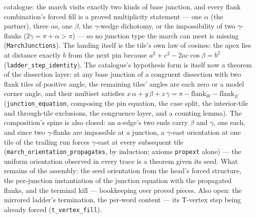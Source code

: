 \documentclass[11pt,reqno]{amsart}
\theoremstyle{plain}
\theoremstyle{definition}
\begin{document}
catalogue: the march visits exactly two kinds of base junction, and every flank combination's
forced fill is a proved multiplicity statement --- one $\alpha$ (the partner), three $\alpha$s,
one $\beta$, the $\gamma$-wedge dichotomy, or the impossibility of two $\gamma$-flanks
($2\gamma=\pi+\alpha>\pi$) --- so no junction type the march can meet is missing
(\texttt{MarchJunctions}). The landing itself is the tile's own law of cosines: the apex lies at
distance exactly $b$ from the next pin because $a^2+c^2-2ac\cos\beta=b^2$
(\texttt{ladder\_step\_identity}). The catalogue's hypothesis form is itself now a theorem of the dissection layer: at any base
junction of a congruent dissection with two flank tiles of positive angle, the remaining tiles'
angles are each zero or a model corner angle, and their multiset satisfies
$x\,\alpha+y\,\beta+z\,\gamma=\pi-\mathrm{flank}_W-\mathrm{flank}_E$
(\texttt{junction\_equation}, composing the pin equation, the case split, the interior-tile and
through-tile exclusions, the congruence layer, and a counting lemma). The composition's spine is also closed: an $a$-edge's two ends carry $\beta$ and $\gamma$, one
each, and since two $\gamma$-flanks are impossible at a junction, a $\gamma$-east orientation at
one tile of the trailing run forces $\gamma$-east at every subsequent tile
(\texttt{march\_orientation\_propagates}, by induction; axioms \texttt{propext} alone) --- the
uniform orientation observed in every trace is a theorem given its seed. What remains of the
assembly: the seed orientation from the head's forced structure, the per-junction instantiation of
the junction equation with the propagated flanks, and the terminal kill --- bookkeeping over
proved pieces. Also open: the
mirrored ladder's termination, the per-word content --- its T-vertex step being already forced
(\texttt{t\_vertex\_fill}).
\end{document}
